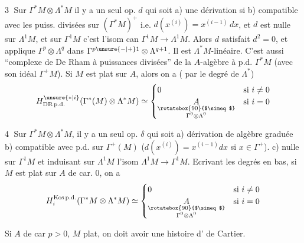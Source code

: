 
\textcircled{3} Sur $\Gamma^*M\otimes\Lambda^*M$  il y a un seul op. $d$ qui soit
 a) une dérivation si 
 b)  compatible avec les puiss. divisées sur $(\Gamma^*M)^+$ i.e. $d(x^{(i)})=x^{(i-1)}\,dx$, et
 $d$ est nulle sur $\Lambda^1M$, et sur $\Gamma^1 M$ c'est l'isom can $\Gamma^1 M\longrightarrow\Lambda^1 M$.
Alors $d$ satisfait $d^2=0$, et applique $\Gamma^p\otimes\Lambda^q$ dans $\Gamma^{p\unsure{-|+}1}\otimes\Lambda^{q+1}$. Il est $\Lambda^*M$-linéaire.
C'est aussi  ``complexe de De Rham à puissances divisées'' de la $A$-algèbre à p.d. $\Gamma^*M$ (avec son idéal $\Gamma^+M$).
Si $M$ est plat sur $A$, alors on a ( par le degré de $\Lambda^*$)
\[
 H^{\unsure{*|i}}_{\mathrm{DR\,p.d.}}(\Gamma^*(M)\otimes\Lambda^* M)
 \simeq\begin{cases}0&\text{si }i\ne0\\
 \underset{\substack{\rotatebox{90}{$\simeq$}\\\Gamma^0\otimes\Lambda^0}}{A}&\text{si }i=0\end{cases}
\]


\textcircled{4} Sur $\Gamma^*M\otimes\Lambda^*M$, il y a un seul op. $\delta$ qui soit
a) dérivation de algèbre graduée b) compatible avec p.d. sur $\Gamma^+(M)$ ($d(x^{(i)})=x^{(i-1)}dx$ si $x\in\Gamma^+$).
c) nulle sur $\Gamma^1 M$  et induisant sur $\Lambda^1M$ l'isom $\Lambda^1M\longrightarrow\Gamma^1M$.
  
Ecrivant les degrés en bas, si $M$ est plat  sur $A$  de car. $0$, on a
\[
 H_i^{\mathrm{Kos\,p.d.}}(\Gamma^*M\otimes\Lambda^*M)\simeq
 \begin{cases}0&\text{si }i\ne0\\
 \underset{\substack{\rotatebox{90}{$\simeq$}\\\Gamma^0\otimes\Lambda^0}}{A}&\text{si }i=0\end{cases}
\]

Si $A$ de car $p>0$, $M$ plat, on doit avoir une histoire d' de Cartier.


